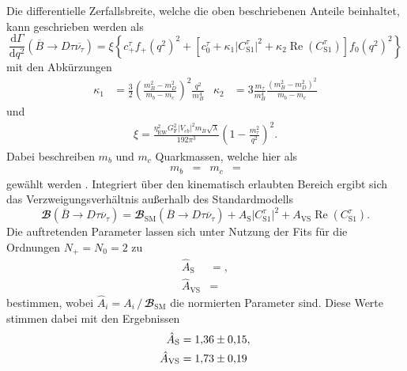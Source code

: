 Die differentielle Zerfallsbreite, welche die oben beschriebenen Anteile beinhaltet, kann geschrieben werden als \cite{PhysRevD.88.094012}
\begin{equation}
  \label{eqn:wq_bsm}
  \frac{\mathrm{d} \Gamma}{\mathrm{d} q^2} \left(\overline{B} \to D \tau \overline{\nu_{\tau}} \right) = \xi \left\lbrace c_+^{\tau} f_+(q^2)^2 + \left\lbrack c_0^{\tau} + \kappa_1 \lvert C_{\text{S}1}^{\tau} \rvert^2 + \kappa_2 \operatorname{Re}(C_{\text{S}1}^{\tau}) \right\rbrack f_0(q^2)^2 \right\rbrace
\end{equation}
mit den Abkürzungen
\begin{align*}
  \kappa_1 &= \frac{3}{2} \left( \frac{m_B^2 - m_D^2}{m_b - m_c} \right)^2 \frac{q^2}{m_B^4} & \kappa_2 &= 3  \frac{m_\tau}{m_B^4} \frac{(m_B^2 - m_D^2)^2}{m_b - m_c}
\end{align*}
und
\begin{align*}
  \xi = \frac{\eta_\text{EW}^2 G_\text{F}^2 \lvert V_{cb} \rvert^2 m_B \sqrt{\lambda} }{192 \pi^3} \left( 1 - \frac{m_\tau^2}{q^2} \right)^2.
\end{align*}
Dabei beschreiben $m_b$ und $m_c$ Quarkmassen, welche hier als
\begin{align*}
  m_b &=  & m_c &= 
\end{align*}
gewählt werden \cite{Agashe:2014kda}.
Integriert über den kinematisch erlaubten Bereich ergibt sich das Verzweigungsverhältnis außerhalb des Standardmodells
\begin{equation}
  \label{eqn:R_bsm}
  {\mathbfcal{B}}\!\left(\overline{B} \to D \tau \overline{\nu}_\tau \right) = {\mathbfcal{B}}_\text{SM}\!\left(\overline{B} \to D \tau \overline{\nu}_\tau \right) + A_\text{S} \lvert C_{\text{S}1}^{\tau} \rvert^2 + A_{\text{VS}} \operatorname{Re}(C_{\text{S}1}^{\tau}).
\end{equation}
Die auftretenden Parameter lassen sich unter Nutzung der Fits für die Ordnungen $N_+ = N_0 = \num{2}$ zu
\begin{align*}
  \hat{A}_\text{S} &= , \\
  \hat{A}_{\text{VS}} &= 
\end{align*}
bestimmen, wobei $\hat{A}_i = A_i \,/\, {\mathbfcal{B}}_\text{SM}$ die normierten Parameter sind.
Diese Werte stimmen dabei mit den Ergebnissen
\begin{align*}
  \hat{A}_\text{S} &= \num{1.36+-0.15}, \\
  \hat{A}_{\text{VS}} &= \num{1.73+-0.19}
\end{align*}
